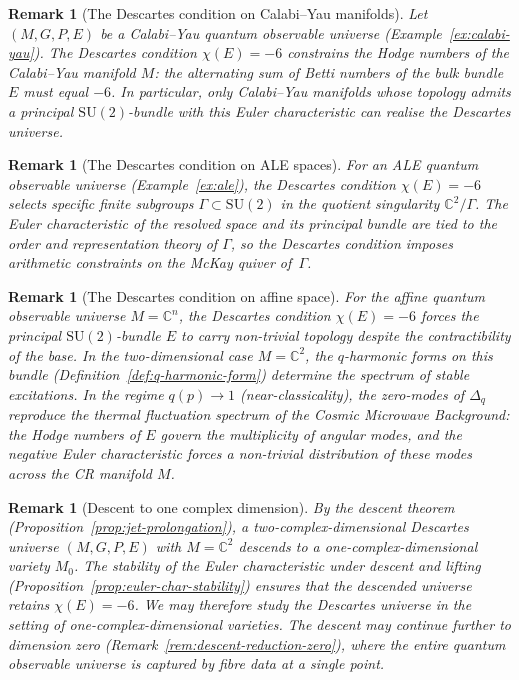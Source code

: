 \documentclass[12pt,a4paper]{report}
\newtheorem{remark}[theorem]{Remark}
\begin{document}
\begin{remark}[The Descartes condition on Calabi--Yau manifolds]
\label{rem:descartes-calabi-yau}
Let $(M, G, P, E)$ be a Calabi--Yau quantum observable universe
(Example~\ref{ex:calabi-yau}).  The Descartes condition $\chi(E) = -6$
constrains the Hodge numbers of the Calabi--Yau manifold $M$: the
alternating sum of Betti numbers of the bulk bundle $E$ must equal $-6$.
In particular, only Calabi--Yau manifolds whose topology admits a principal
$\mathrm{SU}(2)$-bundle with this Euler characteristic can realise the
Descartes universe.
\end{remark}

\begin{remark}[The Descartes condition on ALE spaces]
\label{rem:descartes-ale}
For an ALE quantum observable universe (Example~\ref{ex:ale}), the Descartes
condition $\chi(E) = -6$ selects specific finite subgroups
$\Gamma \subset \mathrm{SU}(2)$ in the quotient singularity
$\mathbb{C}^2 / \Gamma$.  The Euler characteristic of the resolved space
and its principal bundle are tied to the order and representation theory of
$\Gamma$, so the Descartes condition imposes arithmetic constraints on the
McKay quiver of~$\Gamma$.
\end{remark}

\begin{remark}[The Descartes condition on affine space]
\label{rem:descartes-affine}
For the affine quantum observable universe $M = \mathbb{C}^n$,
the Descartes condition $\chi(E) = -6$ forces the
principal $\mathrm{SU}(2)$-bundle $E$ to carry non-trivial topology despite
the contractibility of the base.  In the two-dimensional case $M = \mathbb{C}^2$,
the $q$-harmonic forms on this bundle
(Definition~\ref{def:q-harmonic-form}) determine the spectrum of stable
excitations.  In the regime $q(p) \to 1$ (near-classicality), the zero-modes
of $\Delta_q$ reproduce the thermal fluctuation spectrum of the Cosmic
Microwave Background: the Hodge numbers of $E$ govern the multiplicity of
angular modes, and the negative Euler characteristic forces a non-trivial
distribution of these modes across the CR manifold $M$.
\end{remark}



\begin{remark}[Descent to one complex dimension]
\label{rem:descent-one-dim}
By the descent theorem (Proposition~\ref{prop:jet-prolongation}), a
two-complex-dimensional Descartes universe $(M, G, P, E)$ with $M = \mathbb{C}^2$
descends to a one-complex-dimensional variety $M_0$.  The stability of the
Euler characteristic under descent and lifting
(Proposition~\ref{prop:euler-char-stability}) ensures that the descended
universe retains $\chi(E) = -6$.  We may therefore study the Descartes
universe in the setting of one-complex-dimensional varieties.
The descent may continue further to dimension zero
(Remark~\ref{rem:descent-reduction-zero}), where the entire quantum
observable universe is captured by fibre data at a single point.
\end{remark}
\end{document}
